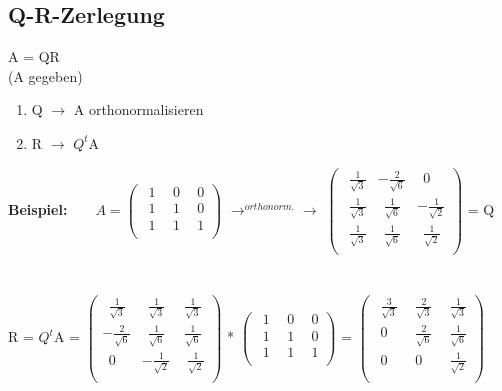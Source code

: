\subsection{Q-R-Zerlegung}
	A = QR\\
	(A gegeben)
	\begin{enumerate}
		\item Q $\rightarrow$ A orthonormalisieren 
		\item R $\rightarrow$ $Q^t$A 
	\end{enumerate} 
	\textbf{Beispiel:}\ \ \ \  
	$A=	\left(\begin{array}{ccc}
		\ \ 1 &\ \ 0 &\ \ 0\\
		\ \ 1 &\ \ 1 &\ \ 0\\
		\ \ 1 &\ \ 1 &\ \ 1\\
	\end{array}\right)$
	$\rightarrow^{orthonorm.}\rightarrow$
	$\left(\begin{array}{ccc}
		\ \ \frac 1 {\sqrt 3}  & -\frac 2 {\sqrt 6} &\ \ 0\\
		\ \ \frac 1 {\sqrt 3} &\ \ \frac 1 {\sqrt 6} & -\frac 1 {\sqrt 2}\\
		\ \ \frac 1 {\sqrt 3} &\ \ \frac 1 {\sqrt 6} &\ \ \frac 1 {\sqrt 2}\\
	\end{array}\right)$ = Q\\\\\\
	R = $Q^t$A = 
	$\left(\begin{array}{ccc}
			\ \ \frac 1 {\sqrt 3}  &\ \ \frac 1 {\sqrt 3} &\ \frac 1 {\sqrt 3}\\
			 -\frac 2 {\sqrt 6} &\ \ \frac 1 {\sqrt 6} &\ \frac 1 {\sqrt 6}\\
			\ \ 0 & -\frac 1 {\sqrt 2} &\ \ \frac 1 {\sqrt 2}\\
		\end{array}\right)$ * 
	$\left(\begin{array}{ccc}
		\ \ 1 &\ \ 0 &\ \ 0\\
		\ \ 1 &\ \ 1 &\ \ 0\\
		\ \ 1 &\ \ 1 &\ \ 1\\
	\end{array}\right)$ =
	$\left(\begin{array}{ccc}
		\ \ \frac 3 {\sqrt 3} &\ \ \frac 2 {\sqrt 3} &\ \ \frac 1 {\sqrt 3}\\
		\ \ 0 &\ \ \frac 2 {\sqrt 6} &\ \ \frac 1 {\sqrt 6}\\
		\ \ 0 &\ \ 0 &\ \ \frac 1 {\sqrt 2}\\
	\end{array}\right)$


